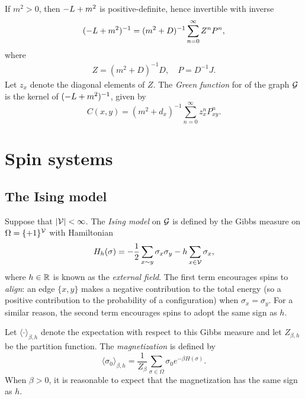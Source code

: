 If $m^2 > 0$, then $-L + m^2$ is positive-definite, hence invertible with inverse
\begin{equation}
(-L + m^2)^{-1} = (m^2 + D)^{-1} \sum_{n=0}^\infty Z^n P^n,
\end{equation}
where
\begin{align}
Z = (m^2 + D)^{-1} D,
  \quad
P = D^{-1} J.
\end{align}
Let $z_x$ denote the diagonal elements of $Z$. The \emph{Green function} for
of the graph $\mathcal{G}$ is the kernel of $(-L + m^2)^{-1}$, given by
\begin{equation}
\label{e:greendef}
C(x, y)
  =
(m^2 + d_x)^{-1} \sum_{n=0}^\infty z_x^n P^n_{xy}.
\end{equation}


\section{Spin systems}

\subsection{The Ising model}

Suppose that $|\mathcal{V}| < \infty$.
The \emph{Ising model} on $\mathcal{G}$ is defined by the Gibbs measure on $\Omega = \{ + 1 \}^{\mathcal{V}}$
with Hamiltonian
\begin{equation}
H_h(\sigma)
	=
-\frac{1}{2} \sum_{x \sim y} \sigma_x \sigma_y - h \sum_{x\in\mathcal{V}} \sigma_x,
\end{equation}
where $h \in {\mathbb R}$ is known as the \emph{external field}.
The first term encourages spins to \emph{align}: an edge $\{ x, y \}$ makes
a negative contribution to the total energy (so a positive contribution to
the probability of a configuration) when $\sigma_x = \sigma_y$.
For a similar reason, the second term encourages spins to adopt the same sign as $h$.

Let $\langle\cdot\rangle_{\beta,h}$ denote the expectation with respect to
this Gibbs measure and let $Z_{\beta,h}$ be the partition function.
The \emph{magnetization} is defined by
\begin{equation}
\langle \sigma_0 \rangle_{\beta,h} = \frac{1}{Z_\beta} \sum_{\sigma\in\Omega} \sigma_0 e^{-\beta H(\sigma)}.
\end{equation}
When $\beta > 0$, it is reasonable to expect that the magnetization has the
same sign as $h$.

